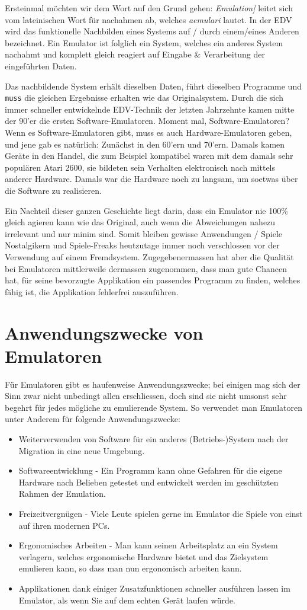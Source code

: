 \documentclass[b5paper,10pt,dvips,fleqn,titlepage,twoside]{book}
\begin{document}
Ersteinmal möchten wir dem Wort auf den Grund gehen: \emph{Emulation]} leitet sich vom lateinischen Wort für nachahmen ab, welches \emph{aemulari} lautet.
In der EDV wird das funktionelle Nachbilden eines Systems auf / durch einem/eines Anderen bezeichnet. Ein Emulator ist folglich ein System, welches ein anderes System nachahmt und komplett gleich reagiert auf Eingabe \& Verarbeitung der eingeführten Daten.

Das nachbildende System erhält dieselben Daten, führt dieselben Programme und \texttt{muss} die gleichen Ergebnisse erhalten wie das Originalsystem. Durch die sich immer schneller entwickelnde EDV-Technik der letzten Jahrzehnte kamen mitte der 90'er die ersten Software-Emulatoren. Moment mal, Software-Emulatoren? Wenn es Software-Emulatoren gibt, muss es auch Hardware-Emulatoren geben, und jene gab es natürlich: Zunächst in den 60'ern und 70'ern. Damals kamen Geräte in den Handel, die zum Beispiel kompatibel waren mit dem damals sehr populären Atari 2600, sie bildeten sein Verhalten elektronisch nach mittels anderer Hardware. Damals war die Hardware noch zu langsam, um soetwas über die Software zu realisieren.

Ein Nachteil dieser ganzen Geschichte liegt darin, dass ein Emulator nie 100\% gleich agieren kann wie das Original, auch wenn die Abweichungen nahezu irrelevant und nur minim sind. Somit bleiben gewisse Anwendungen / Spiele Nostalgikern und Spiele-Freaks heutzutage immer noch verschlossen vor der Verwendung auf einem Fremdsystem. Zugegebenermassen hat aber die Qualität bei Emulatoren mittlerweile dermassen zugenommen, dass man gute Chancen hat, für seine bevorzugte Applikation ein passendes Programm zu finden, welches fähig ist, die Applikation fehlerfrei auszuführen.

\section{Anwendungszwecke von Emulatoren}
Für Emulatoren gibt es haufenweise Anwendungszwecke; bei einigen mag sich der Sinn zwar nicht unbedingt allen erschliessen, doch sind sie nicht umsonst sehr begehrt für jedes mögliche zu emulierende System.
So verwendet man Emulatoren unter Anderem für folgende Anwendungszwecke:
\newline
\begin{itemize}
\item Weiterverwenden von Software für ein anderes (Betriebs-)System nach der Migration in eine neue Umgebung.
\item Softwareentwicklung - Ein Programm kann ohne Gefahren für die eigene Hardware nach Belieben getestet und entwickelt werden im geschützten Rahmen der Emulation.
\item Freizeitvergnügen - Viele Leute spielen gerne im Emulator die Spiele von einst auf ihren modernen PCs.
\item Ergonomisches Arbeiten - Man kann seinen Arbeitsplatz an ein System verlagern, welches ergonomische Hardware bietet und das Zielsystem emulieren kann, so dass man nun ergonomisch arbeiten kann.
\item Applikationen dank einiger Zusatzfunktionen schneller ausführen lassen im Emulator, als wenn Sie auf dem echten Gerät laufen würde.
\end{itemize}
\end{document}
